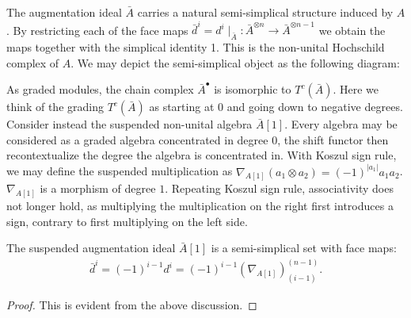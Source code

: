 \documentclass[../thesis.tex]{subfiles}
\begin{document}
            The augmentation ideal $\bar{A}$ carries a natural semi-simplical structure induced by $A$. By restricting each of the face maps ${\bar{d}}^i = d^i {\mid}_{\bar{A}}:\bar{A}^{\otimes n} \rightarrow \bar{A}^{\otimes n-1}$ we obtain the maps together with the simplical identity 1. This is the non-unital Hochschild complex of $A$. We may depict the semi-simplical object as the following diagram:
            \begin{center}
            \end{center}

            As graded modules, the chain complex $\bar{A}^\bullet$ is isomorphic to $T^c(\bar{A})$. Here we think of the grading $T^c(\bar{A})$ as starting at $0$ and going down to negative degrees. Consider instead the suspended non-unital algebra $\bar{A}[1]$. Every algebra may be considered as a graded algebra concentrated in degree $0$, the shift functor then recontextualize the degree the algebra is concentrated in. With Koszul sign rule, we may define the suspended multiplication as $\nabla_{A[1]}(a_1 \otimes a_2) = (-1)^{|a_1|}a_1a_2$. $\nabla_{A[1]}$ is a morphism of degree $1$. Repeating Koszul sign rule, associativity does not longer hold, as multiplying the multiplication on the right first introduces a sign, contrary to first multiplying on the left side.

            \begin{proposition}
                The suspended augmentation ideal $\bar{A}[1]$ is a semi-simplical set with face maps:
                \begin{align*}
                    \bar{d}^i = (-1)^{i-1}d^i = (-1)^{i-1}(\nabla_{A[1]})_{(i-1)}^{(n-1)}\text{.}
                \end{align*}
            \end{proposition}

            \begin{proof}
                This is evident from the above discussion.
            \end{proof}
\end{document}
